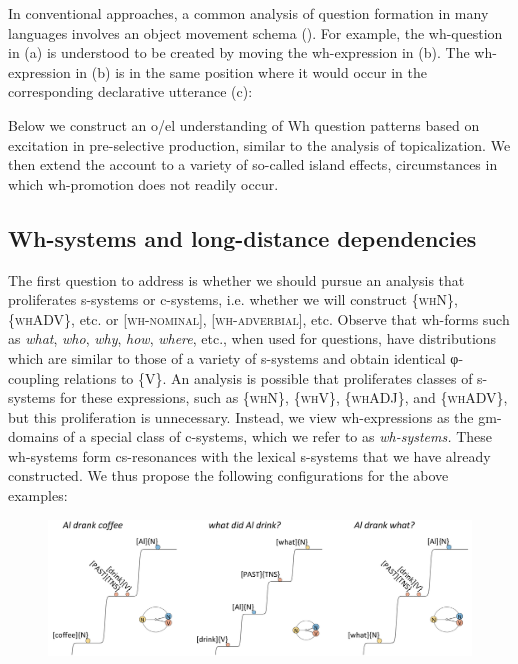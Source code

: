 In conventional approaches, a common analysis of question formation in many languages involves an object movement schema (\citealt{Baker1970,Cheng1997,Chomsky1965,Karttunen1977}). For example, the wh-question in (a) is understood to be created by moving the wh-expression in (b). The wh-expression in (b) is in the same position where it would occur in the corresponding declarative utterance (c):

\ea
{}
\z
\z

  Below we construct an o/el understanding of Wh question patterns based on excitation in pre-selective production, similar to the analysis of topicalization. We then extend the account to a variety of so-called island effects, circumstances in which wh-promotion does not readily occur. 

\subsection{Wh-systems and long-distance dependencies}

The first question to address is whether we should pursue an analysis that proliferates s-systems or c-systems, i.e. whether we will construct \{\textsc{whN}\}, \{\textsc{whADV}\}, etc. or [\textsc{wh-nominal}], [\textsc{wh-adverbial}], etc. Observe that wh-forms such as \textit{what}, \textit{who}, \textit{why}, \textit{how}, \textit{where}, etc., when used for questions, have distributions which are similar to those of a variety of s-systems and obtain identical φ-coupling relations to \{V\}. An analysis is possible that proliferates classes of s-systems for these expressions, such as \{\textsc{whN}\}, \{\textsc{whV}\}, \{\textsc{whADJ}\}, and \{\textsc{whADV}\}, but this proliferation is unnecessary. Instead, we view wh-expressions as the gm-domains of a special class of c-systems, which we refer to as \textit{wh-systems.} These wh-systems form cs-resonances with the lexical s-systems that we have already constructed. We thus propose the following configurations for the above examples:

  
\begin{figure}
\includegraphics[width=\textwidth]{figures/Tilsen-img158.png}
\caption{\missingcaption}
\label{fig:}
\end{figure}
 

